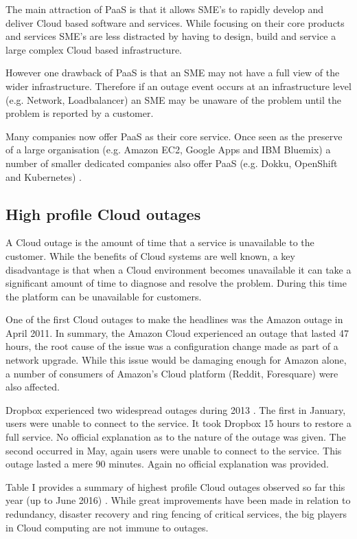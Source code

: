 \documentclass[5p]{elsarticle}
\begin{document}
The main attraction of PaaS is that it allows SME's to rapidly develop and deliver Cloud based software and services. While focusing on their core products and services SME's are less distracted by having to design, build and service a large complex Cloud based infrastructure. 

However one drawback of PaaS is that an SME may not have a full view of the wider infrastructure. Therefore if an outage event occurs at an infrastructure level (e.g. Network, Loadbalancer) an SME may be unaware of the problem until the problem is reported by a customer.

Many companies now offer PaaS as their core service. Once seen as the preserve of a large organisation (e.g. Amazon EC2, Google Apps and IBM Bluemix) a number of smaller dedicated companies also offer PaaS (e.g. Dokku, OpenShift and Kubernetes) \cite{Paas2016}.


\subsection{High profile Cloud outages}
A Cloud outage is the amount of time that a service is unavailable to the customer. While the benefits of Cloud systems are well known, a key disadvantage is that when a Cloud environment becomes unavailable it can take a significant amount of time to diagnose and resolve the problem. During this time the platform can be unavailable for customers.

One of the first Cloud outages to make the headlines was the Amazon outage in April 2011. In summary, the Amazon Cloud experienced an outage that lasted 47 hours, the root cause of the issue was a configuration change made as part of a network upgrade. While this issue would be damaging enough for Amazon alone, a number of consumers of Amazon's Cloud platform (Reddit, Foresquare) were also affected. \cite{InfoWorld2015outage} 

Dropbox experienced two widespread outages during 2013 \cite{Talbot013DBoutage, Etherington2013DBoutage}. The first in January, users were unable to connect to the service. It took Dropbox 15 hours to restore a full service. No official explanation as to the nature of the outage was given. The second occurred in May, again users were unable to connect to the service. This outage lasted a mere 90 minutes. Again no official explanation was provided.

Table I provides a summary of highest profile Cloud outages observed so far this year (up to June 2016)\cite{CRN2016outage} . While great improvements have been made in relation to redundancy, disaster recovery and ring fencing of critical services, the big players in Cloud computing are not immune to outages.
\end{document}
